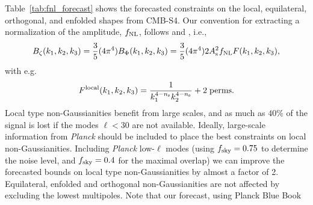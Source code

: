 
%
Table~\ref{tab:fnl_forecast} shows the forecasted constraints on the local, equilateral, orthogonal, and enfolded shapes from CMB-S4. Our convention for extracting a normalization of the amplitude, $f_{\rm NL}$, follows \cite{Babich:2004gb} and \cite{Ade:2013ydc}, i.e., 
\begin{equation}
B_{\zeta}(k_1,k_2,k_3) = \frac{3}{5} (4 \pi^4) B_{\Phi} (k_1,k_2,k_3) = \frac{3}{5} (4 \pi^4) 2 A_{\rm s}^2 f_{\rm NL} F(k_1,k_2,k_3) ,
\end{equation}
with e.g. 
\begin{equation}
F^{\rm local}(k_1,k_2,k_3) = \frac{1}{k_1^{4-n_{\rm s}}k_2^{4-n_{\rm s}}} + {\rm 2\;perms.}
\end{equation}
Local type non-Gaussianities benefit from large scales, and as much as $40\%$ of the signal is lost if the modes $\ell<30$ are not available. 
Ideally, large-scale information from {\it Planck\/} \cite{Ade:2015ava} should be included to place the best constraints on local non-Gaussianities. Including {\it Planck\/} low-$\ell$ modes (using $f_{\rm sky} = 0.75$ \cite{Ade:2015ava} to determine the noise level, and $f_{\rm sky}=0.4$ for the maximal overlap) we can improve the forecasted bounds on local type non-Gaussianities by almost a factor of 2. Equilateral, enfolded and orthogonal non-Gaussianities are not affected by excluding the lowest multipoles. Note that our forecast, using Planck Blue Book\cite{planck2005-bluebook}

